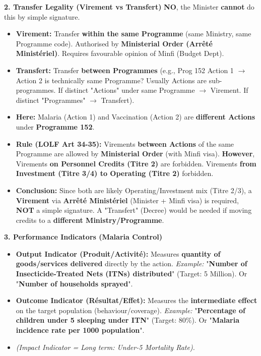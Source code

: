 \documentclass[11pt]{article}
\begin{document}
\begin{exoresolu}
\textbf{2. Transfer Legality (Virement vs Transfert)}
\textbf{NO}, the Minister \textbf{cannot} do this by simple signature.
\begin{itemize}
    \item \textbf{Virement:} Transfer \textbf{within the same Programme} (same Ministry, same Programme code). Authorised by \textbf{Ministerial Order (Arrêté Ministériel)}. Requires favourable opinion of Minfi (Budget Dept).
    \item \textbf{Transfert:} Transfer \textbf{between Programmes} (e.g., Prog 152 Action 1 $\rightarrow$ Action 2 is technically same Programme? Usually Actions are sub-programmes. If distinct "Actions" under same Programme $\rightarrow$ Virement. If distinct "Programmes" $\rightarrow$ Transfert).
    \item \textbf{Here:} Malaria (Action 1) and Vaccination (Action 2) are \textbf{different Actions} under \textbf{Programme 152}.
    \item \textbf{Rule (LOLF Art 34-35):} Virements \textbf{between Actions} of the same Programme are allowed by \textbf{Ministerial Order} (with Minfi visa). \textbf{However}, Virements \textbf{on Personnel Credits (Titre 2)} are forbidden. Virements \textbf{from Investment (Titre 3/4) to Operating (Titre 2)} forbidden.
    \item \textbf{Conclusion:} Since both are likely Operating/Investment mix (Titre 2/3), a \textbf{Virement} via \textbf{Arrêté Ministériel} (Minister + Minfi visa) is required, \textbf{NOT} a simple signature. A "Transfert" (Decree) would be needed if moving credits to a \textbf{different Ministry/Programme}.
\end{itemize}

\textbf{3. Performance Indicators (Malaria Control)}
\begin{itemize}
    \item \textbf{Output Indicator (Produit/Activité):} Measures \textbf{quantity of goods/services delivered} directly by the action.
    \textit{Example:} "\textbf{Number of Insecticide-Treated Nets (ITNs) distributed}" (Target: 5 Million). Or "\textbf{Number of households sprayed}".
    \item \textbf{Outcome Indicator (Résultat/Effet):} Measures the \textbf{intermediate effect} on the target population (behaviour/coverage).
    \textit{Example:} "\textbf{Percentage of children under 5 sleeping under ITN}" (Target: 80\%). Or "\textbf{Malaria incidence rate per 1000 population}".
    \item \textit{(Impact Indicator = Long term: Under-5 Mortality Rate).}
\end{itemize}


\end{exoresolu}
\end{document}
